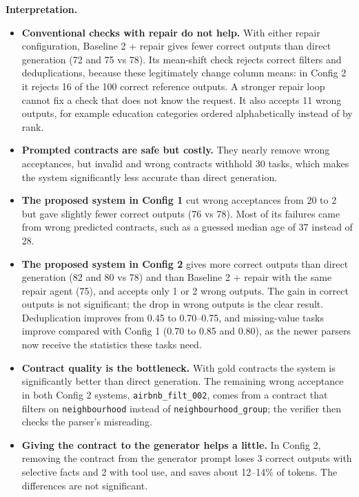 \documentclass[11pt]{article}
\providecommand{\tightlist}{\setlength{\itemsep}{0pt}\setlength{\parskip}{0pt}}
\begin{document}
\textbf{Interpretation.}

\begin{itemize}
\tightlist
\item
  \textbf{Conventional checks with repair do not help.} With either
  repair configuration, Baseline 2 + repair gives fewer correct outputs
  than direct generation (72 and 75 vs 78). Its mean-shift check rejects
  correct filters and deduplications, because these legitimately change
  column means: in Config 2 it rejects 16 of the 100 correct reference
  outputs. A stronger repair loop cannot fix a check that does not know
  the request. It also accepts 11 wrong outputs, for example education
  categories ordered alphabetically instead of by rank.
\item
  \textbf{Prompted contracts are safe but costly.} They nearly remove
  wrong acceptances, but invalid and wrong contracts withhold 30 tasks,
  which makes the system significantly less accurate than direct
  generation.
\item
  \textbf{The proposed system in Config 1} cut wrong acceptances from 20
  to 2 but gave slightly fewer correct outputs (76 vs 78). Most of its
  failures came from wrong predicted contracts, such as a guessed median
  age of 37 instead of 28.
\item
  \textbf{The proposed system in Config 2} gives more correct outputs
  than direct generation (82 and 80 vs 78) and than Baseline 2 + repair
  with the same repair agent (75), and accepts only 1 or 2 wrong
  outputs. The gain in correct outputs is not significant; the drop in
  wrong outputs is the clear result. Deduplication improves from 0.45 to
  0.70--0.75, and missing-value tasks improve compared with Config 1
  (0.70 to 0.85 and 0.80), as the newer parsers now receive the
  statistics these tasks need.
\item
  \textbf{Contract quality is the bottleneck.} With gold contracts the
  system is significantly better than direct generation. The remaining
  wrong acceptance in both Config 2 systems,
  \texttt{airbnb\_\allowbreak{}filt\_\allowbreak{}002}, comes from a
  contract that filters on \texttt{neighbourhood} instead of
  \texttt{neighbourhood\_\allowbreak{}group}; the verifier then checks
  the parser's misreading.
\item
  \textbf{Giving the contract to the generator helps a little.} In
  Config 2, removing the contract from the generator prompt loses 3
  correct outputs with selective facts and 2 with tool use, and saves
  about 12--14\% of tokens. The differences are not significant.
\end{itemize}
\end{document}
